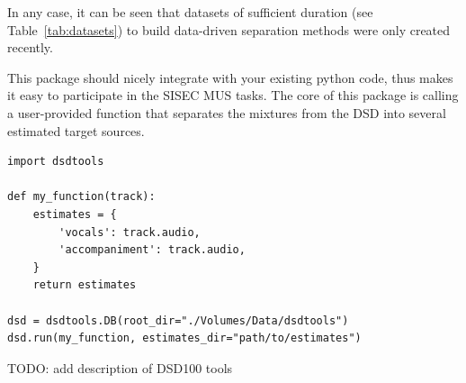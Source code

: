 In any case, it can be seen that datasets of sufficient duration (see Table~\ref{tab:datasets}) to build data-driven separation methods were only created recently.

This package should nicely integrate with your existing python code, thus makes it easy to participate in the SISEC MUS tasks. The core of this package is calling a user-provided function that separates the mixtures from the DSD into several estimated target sources.

\begin{verbatim}
import dsdtools

def my_function(track):
    estimates = {
        'vocals': track.audio,
        'accompaniment': track.audio,
    }
    return estimates

dsd = dsdtools.DB(root_dir="./Volumes/Data/dsdtools")
dsd.run(my_function, estimates_dir="path/to/estimates")
\end{verbatim}

TODO: add description of DSD100 tools




